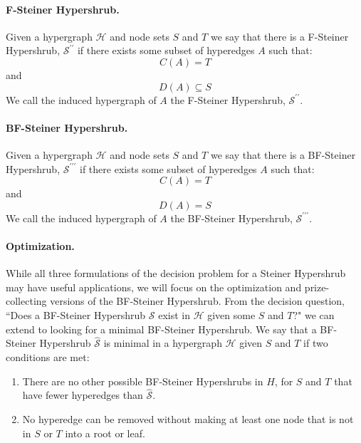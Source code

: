 \documentclass[12pt,twoside]{reedthesis}
\theoremstyle{definition}
\begin{document}
\paragraph{F-Steiner Hypershrub.}Given a hypergraph $\mathcal{H}$ and node sets $S$ and $T$ we say that there is a F-Steiner Hypershrub, $\mathcal{S}^{\prime\prime}$ if there exists some subset of hyperedges $A$ such that:
\begin{equation*}
  C(A) = T
\end{equation*}
and
\begin{equation*}
  D(A) \subseteq S
\end{equation*}
We call the induced hypergraph of $A$ the F-Steiner Hypershrub, $\mathcal{S}^{\prime\prime}$.\par
\paragraph{BF-Steiner Hypershrub.}Given a hypergraph $\mathcal{H}$ and node sets $S$ and $T$ we say that there is a BF-Steiner Hypershrub, $\mathcal{S}^{\prime\prime\prime}$ if there exists some subset of hyperedges $A$ such that:
\begin{equation*}
  C(A) = T
\end{equation*}
and
\begin{equation*}
  D(A) = S
\end{equation*}
We call the induced hypergraph of $A$ the BF-Steiner Hypershrub, $\mathcal{S}^{\prime\prime\prime}$.\par

\paragraph{Optimization.}While all three formulations of the decision problem for a Steiner Hypershrub may have useful applications, we will focus on the optimization and prize-collecting versions of the BF-Steiner Hypershrub. From the decision question, ``Does a BF-Steiner Hypershrub $\mathcal{S}$ exist in $\mathcal{H}$ given some $S$ and $T$?" we can extend to looking for a minimal BF-Steiner Hypershrub. We say that a BF-Steiner Hypershrub $\hat{\mathcal{S}}$ is minimal in a hypergraph $\mathcal{H}$ given $S$ and $T$ if two conditions are met:\par
\begin{enumerate}
  \item{There are no other possible BF-Steiner Hypershrubs in $H$, for $S$ and $T$ that have fewer hyperedges than $\hat{\mathcal{S}}$.}
  \item{No hyperedge can be removed without making at least one node that is not in $S$ or $T$ into a root or leaf.}
\end{enumerate}
\end{document}

